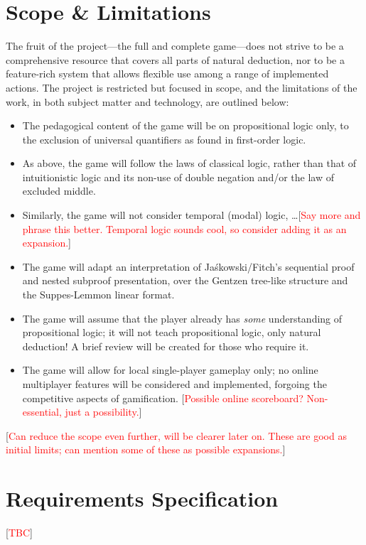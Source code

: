 \documentclass[a4paper]{article}
\newcommand{\comment}[1]{[\textcolor{red}{#1}]} %
\begin{document}
\section{Scope \& Limitations}
The fruit of the project---the full and complete game---does not strive to be a comprehensive resource that covers all parts of natural deduction, nor to be a feature-rich system that allows flexible use among a range of implemented actions. The project is restricted but focused in scope, and the limitations of the work, in both subject matter and technology, are outlined below:
\begin{itemize}
  \item The pedagogical content of the game will be on propositional logic only, to the exclusion of universal quantifiers as found in first-order logic.
  \item As above, the game will follow the laws of classical logic, rather than that of intuitionistic logic and its non-use of double negation and/or the law of excluded middle.
  \item Similarly, the game will not consider temporal (modal) logic, \dots \comment{Say more and phrase this better. Temporal logic sounds cool, so consider adding it as an expansion.}
  \item The game will adapt an interpretation of Ja\'{s}kowski/Fitch's sequential proof and nested subproof presentation, over the Gentzen tree-like structure and the Suppes-Lemmon linear format. \autocite{pelletier2000history}
  \item The game will assume that the player already has \emph{some} understanding of propositional logic; it will not teach propositional logic, only natural deduction! A brief review will be created for those who require it.
  \item The game will allow for local single-player gameplay only; no online multiplayer features will be considered and implemented, forgoing the competitive aspects of gamification. \comment{Possible online scoreboard? Non-essential, just a possibility.}
\end{itemize}

\comment{Can reduce the scope even further, will be clearer later on. These are good as initial limits; can mention some of these as possible expansions.}

\section{Requirements Specification}
\comment{TBC}
\end{document}
